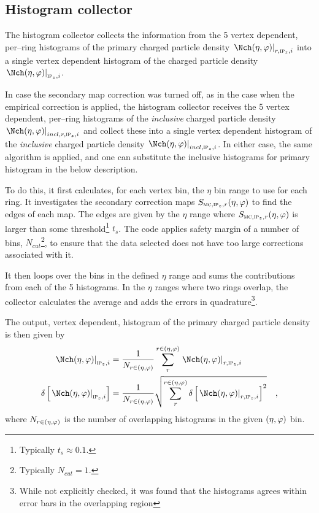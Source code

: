 \documentclass[compat,11pt]{alicenote}
\newcommand*{\etaphi}{\ensuremath(\eta,\varphi)}
\newcommand*\SecMap{\ensuremath S_{\subMC,\subIPz,r}\etaphi}
\newcommand{\dndetadphi}[1][]{{\ensuremath%
    \ifx|#1|\else\left.\fi%
      \Nch\etaphi%
      \ifx|#1|\else\right|_{#1}\fi}}
\begin{document}
\subsection{Histogram collector}
\label{sec:sub:hist_collector}

The histogram collector collects the information from the 5 vertex
dependent, per--ring histograms of the primary charged particle
density $\dndetadphi[r,\subIPz,i]$ into a single vertex dependent
histogram of the charged particle density $\dndetadphi[\subIPz,i]$.

In case the secondary map correction was turned off, as in the case
when the empirical correction is applied, the histogram collector
receives the 5 vertex dependent, per--ring histograms of the
\emph{inclusive} charged particle density
$\dndetadphi[incl,r,\subIPz,i]$ and collect these into a single vertex
dependent histogram of the \emph{inclusive} charged particle density
$\dndetadphi[incl,\subIPz,i]$.  In either case, the same algorithm is
applied, and one can substitute the inclusive histograms for primary
histogram in the below description. 

To do this, it first calculates, for each vertex bin, the $\eta$ bin
range to use for each ring.  It investigates the secondary correction
maps $\SecMap{}$ to find the edges of each map.  The edges are given
by the $\eta$ range where $\SecMap{}$ is larger than some
threshold\footnote{Typically $t_s\approx 0.1$.}  $t_s$. The code
applies safety margin of a number of bins,
$N_{cut}$\footnote{Typically $N_{cut}=1$.}, to ensure that the data
selected does not have too large corrections associated with it.

It then loops over the bins in the defined $\eta$ range and sums the
contributions from each of the 5 histograms.  In the $\eta$ ranges
where two rings overlap, the collector calculates the average and adds
the errors in quadrature\footnote{While not explicitly checked, it was
  found that the histograms agrees within error bars in the
  overlapping region}.

The output, vertex dependent, histogram of the primary
charged particle density is then given by
\begin{align}
  \label{eq:superhist}
  \dndetadphi[\subIPz,i] &=
  \frac{1}{N_{r\in\etaphi}}\sum_{r}^{r\in\etaphi}  
  \dndetadphi[r,\subIPz,i]\\
  \delta\left[\dndetadphi[\subIPz,i]\right] &=
  \frac{1}{N_{r\in\etaphi}}\sqrt{\sum_{r}^{r\in\etaphi}   
    \delta\left[\dndetadphi[r,\subIPz,i]\right]^2}
  \quad,
\end{align}
where $N_{r\in\etaphi}$ is the number of overlapping histograms
in the given $\etaphi$ bin. 
\end{document}
